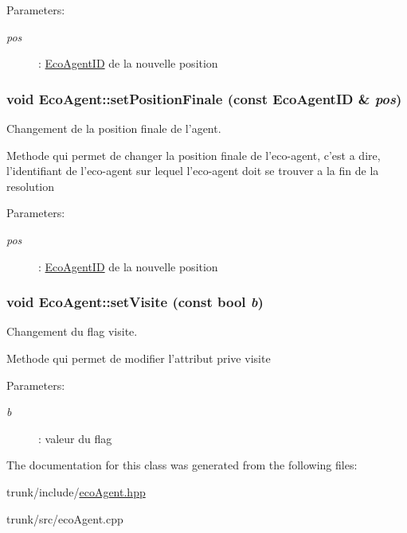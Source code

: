 \begin{Desc}
\item[Parameters:]
\begin{description}
\item[{\em pos}]: \hyperlink{classEcoAgentID}{EcoAgentID} de la nouvelle position \end{description}
\end{Desc}
\hypertarget{classEcoAgent_a0ffbb1fdb23fb5d8ad188e8f16d8c50}{
\subsubsection[{setPositionFinale}]{\setlength{\rightskip}{0pt plus 5cm}void EcoAgent::setPositionFinale (const {\bf EcoAgentID} \& {\em pos})}}
\label{classEcoAgent_a0ffbb1fdb23fb5d8ad188e8f16d8c50}


Changement de la position finale de l'agent. 

Methode qui permet de changer la position finale de l'eco-agent, c'est a dire, l'identifiant de l'eco-agent sur lequel l'eco-agent doit se trouver a la fin de la resolution

\begin{Desc}
\item[Parameters:]
\begin{description}
\item[{\em pos}]: \hyperlink{classEcoAgentID}{EcoAgentID} de la nouvelle position \end{description}
\end{Desc}
\hypertarget{classEcoAgent_aa8d25798a3783276c07725bce711120}{
\subsubsection[{setVisite}]{\setlength{\rightskip}{0pt plus 5cm}void EcoAgent::setVisite (const bool {\em b})}}
\label{classEcoAgent_aa8d25798a3783276c07725bce711120}


Changement du flag visite. 

Methode qui permet de modifier l'attribut prive visite

\begin{Desc}
\item[Parameters:]
\begin{description}
\item[{\em b}]: valeur du flag \end{description}
\end{Desc}


The documentation for this class was generated from the following files:\begin{CompactItemize}
\item 
trunk/include/\hyperlink{ecoAgent_8hpp}{ecoAgent.hpp}\item 
trunk/src/ecoAgent.cpp\end{CompactItemize}
